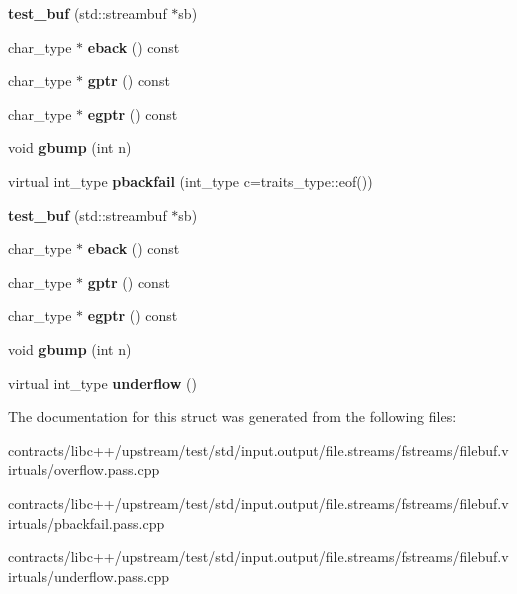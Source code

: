 \begin{DoxyCompactItemize}
{\bfseries test\+\_\+buf} (std\+::streambuf $\ast$sb)
\item 
\mbox{\label{structtest__buf_a28125e70f3e3d4f7e6388feacd5a679a}} 
char\+\_\+type $\ast$ {\bfseries eback} () const
\item 
\mbox{\label{structtest__buf_a647a813e6beea56a0176dbe190a090de}} 
char\+\_\+type $\ast$ {\bfseries gptr} () const
\item 
\mbox{\label{structtest__buf_a885db87a4421d79460cc1007b45acdc4}} 
char\+\_\+type $\ast$ {\bfseries egptr} () const
\item 
\mbox{\label{structtest__buf_a4ef57230c1f973a7581e35cc19548834}} 
void {\bfseries gbump} (int n)
\item 
\mbox{\label{structtest__buf_adbd565e9d5b31502b7d9325dfe605fb5}} 
virtual int\+\_\+type {\bfseries pbackfail} (int\+\_\+type c=traits\+\_\+type\+::eof())
\item 
\mbox{\label{structtest__buf_ae02e6a8cae14c461432605ce343736d8}} 
{\bfseries test\+\_\+buf} (std\+::streambuf $\ast$sb)
\item 
\mbox{\label{structtest__buf_a28125e70f3e3d4f7e6388feacd5a679a}} 
char\+\_\+type $\ast$ {\bfseries eback} () const
\item 
\mbox{\label{structtest__buf_a647a813e6beea56a0176dbe190a090de}} 
char\+\_\+type $\ast$ {\bfseries gptr} () const
\item 
\mbox{\label{structtest__buf_a885db87a4421d79460cc1007b45acdc4}} 
char\+\_\+type $\ast$ {\bfseries egptr} () const
\item 
\mbox{\label{structtest__buf_a4ef57230c1f973a7581e35cc19548834}} 
void {\bfseries gbump} (int n)
\item 
\mbox{\label{structtest__buf_a07968ce7dbc1007c8fb958e085ecc72f}} 
virtual int\+\_\+type {\bfseries underflow} ()
\end{DoxyCompactItemize}


The documentation for this struct was generated from the following files\+:\begin{DoxyCompactItemize}
\item 
contracts/libc++/upstream/test/std/input.\+output/file.\+streams/fstreams/filebuf.\+virtuals/overflow.\+pass.\+cpp\item 
contracts/libc++/upstream/test/std/input.\+output/file.\+streams/fstreams/filebuf.\+virtuals/pbackfail.\+pass.\+cpp\item 
contracts/libc++/upstream/test/std/input.\+output/file.\+streams/fstreams/filebuf.\+virtuals/underflow.\+pass.\+cpp\end{DoxyCompactItemize}
